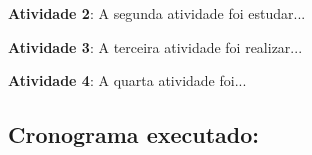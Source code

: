  \label{par:atividade2}
\textbf{Atividade 2}: A segunda atividade foi estudar...\lipsum[2][10-20]

 \label{par:atividade3}
\textbf{Atividade 3}: A terceira atividade foi realizar...\lipsum[3][10-20]

 \label{par:atividade4}
\textbf{Atividade 4}: A quarta atividade foi...\lipsum[4][10-20]

\subsection{Cronograma executado:}
\label{subsec:cronograma}


\lipsum[1][10-20]

